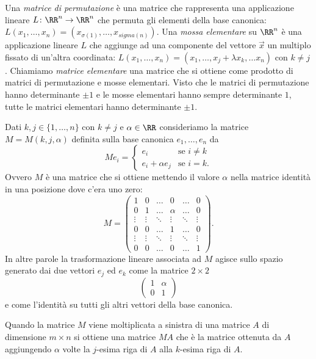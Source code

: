 Una \emph{matrice di permutazione} è una matrice che rappresenta 
una applicazione lineare $L\colon \RR^n\to \RR^n$ che permuta 
gli elementi della base canonica: 
$L (x_1,\dots,x_n) = (x_{\sigma(1)},\dots,x_{sigma(n)})$.
Una \emph{mossa elementare} su $\RR^n$ 
è una applicazione lineare $L$ che aggiunge ad una componente del vettore 
$\vec x$ un multiplo fissato di un'altra coordinata:
$L(x_1,\dots, x_n) = (x_1, \dots, x_j + \lambda x_k, \dots x_n)$
con $k\neq j$.
Chiamiamo \emph{matrice elementare} una matrice che si ottiene 
come prodotto di matrici di permutazione e mosse elementari.
Visto che le matrici di permutazione hanno determinante $\pm 1$
e le mosse elementari hanno sempre determinante $1$, 
tutte le matrici elementari hanno determinante $\pm 1$.

\begin{definition}
Dati $k,j\in \{1,\ldots,n\}$ con $k\neq j$ e $\alpha \in \RR$
consideriamo la matrice $M=M(k,j,\alpha)$ 
definita sulla base canonica $e_1,\dots, e_n$ da 
\[
   M e_i = \begin{cases}
      e_i & \text{se $i\neq k$}\\
      e_i + \alpha e_j & \text{se $i=k$}.
   \end{cases}
\]
Ovvero $M$ è una matrice che si ottiene mettendo il valore $\alpha$
nella matrice identità in una posizione dove c'era uno zero:
\[
   M = \begin{pmatrix}
    1 & 0 & \dots & 0 & \dots & 0\\
    0 & 1 & \dots & \alpha & \dots & 0\\
    \vdots & \vdots & \ddots & \vdots & \ddots & \vdots\\
    0 & 0 & \dots & 1 & \dots & 0\\
    \vdots & \vdots & \ddots & \vdots & \ddots & \vdots\\
    0 & 0 & \dots & 0 & \dots & 1
   \end{pmatrix}.
\]
In altre parole la trasformazione lineare associata ad $M$ 
agisce sullo spazio generato dai due vettori $e_j$ ed $e_k$
come la matrice $2\times 2$
\[
  \begin{pmatrix}
    1 & \alpha\\
    0 & 1
  \end{pmatrix}
\]
e come l'identità su tutti gli altri vettori della base canonica.

Quando la matrice $M$ viene moltiplicata a sinistra 
di una matrice $A$ di dimensione $m\times n$
si ottiene una matrice $M A$ che è la matrice ottenuta da $A$
aggiungendo $\alpha$ volte la $j$-esima riga di $A$
alla $k$-esima riga di $A$.


\end{definition}
